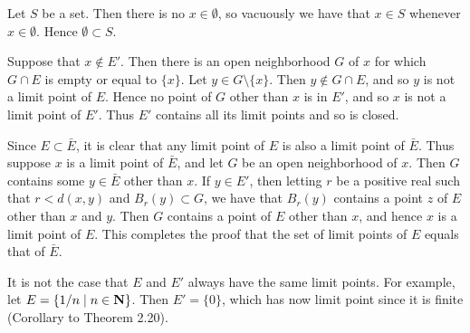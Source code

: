 \begin{ex}
Let $S$ be a set. Then there is no $x \in \emptyset$, so vacuously we have that $x \in S$ whenever $x \in \emptyset$. Hence $\emptyset \subset S$.
\end{ex}

\begin{ex}
[TODO]
\end{ex}

\begin{ex}
[TODO]
\end{ex}

\begin{ex}
[TODO]
\end{ex}

\begin{ex}
[TODO]
\end{ex}

\begin{ex}
Suppose that $x \not \in E'$. Then there is an open neighborhood $G$ of $x$ for which $G\cap E$ is empty or equal to $\{x\}$. Let $y \in G\setminus\{x\}$. Then $y \not \in G\cap E$, and so $y$ is not a limit point of $E$. Hence no point of $G$ other than $x$ is in $E'$, and so $x$ is not a limit point of $E'$. Thus $E'$ contains all its limit points and so is closed.

Since $E \subset \bar{E}$, it is clear that any limit point of $E$ is also a limit point of $\bar{E}$. Thus suppose $x$ is a limit point of $\bar{E}$, and let $G$ be an open neighborhood of $x$. Then $G$ contains some $y \in \bar{E}$ other than $x$. If $y \in E'$, then letting $r$ be a positive real such that $r < d(x, y)$ and $B_r(y) \subset G$, we have that $B_r(y)$ contains a point $z$ of $E$ other than $x$ and $y$. Then $G$ contains a point of $E$ other than $x$, and hence $x$ is a limit point of $E$. This completes the proof that the set of limit points of $E$ equals that of $\bar{E}$.

It is not the case that $E$ and $E'$ always have the same limit points. For example, let $E = \{1/n\mid n \in \mathbf{N}\}$. Then $E' = \{0\}$, which has now limit point since it is finite (Corollary to Theorem 2.20).
\end{ex}

